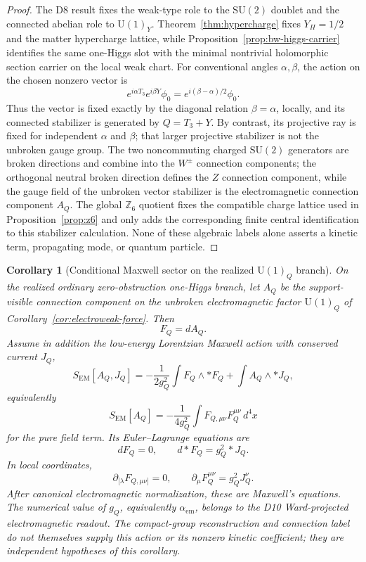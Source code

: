 \documentclass[11pt]{article}
\newtheorem{corollary}[theorem]{Corollary}
\newcommand{\SU}{\mathrm{SU}}
\newcommand{\U}{\mathrm{U}}
\begin{document}
\begin{proof}
The D8 result fixes the weak-type role to the \(\SU(2)\) doublet and the connected abelian role to \(\U(1)_Y\). Theorem~\ref{thm:hypercharge} fixes \(Y_H=1/2\) and the matter hypercharge lattice, while Proposition~\ref{prop:bw-higgs-carrier} identifies the same one-Higgs slot with the minimal nontrivial holomorphic section carrier on the local weak chart. For conventional angles \(\alpha,\beta\), the action on the chosen nonzero vector is
\[
e^{i\alpha T_3}e^{i\beta Y}\phi_0
=e^{i(\beta-\alpha)/2}\phi_0.
\]
Thus the vector is fixed exactly by the diagonal relation \(\beta=\alpha\), locally, and its connected stabilizer is generated by \(Q=T_3+Y\). By contrast, its projective ray is fixed for independent \(\alpha\) and \(\beta\); that larger projective stabilizer is not the unbroken gauge group. The two noncommuting charged \(\SU(2)\) generators are broken directions and combine into the \(W^\pm\) connection components; the orthogonal neutral broken direction defines the \(Z\) connection component, while the gauge field of the unbroken vector stabilizer is the electromagnetic connection component \(A_Q\). The global \(\mathbb Z_6\) quotient fixes the compatible charge lattice used in Proposition~\ref{prop:z6} and only adds the corresponding finite central identification to this stabilizer calculation. None of these algebraic labels alone asserts a kinetic term, propagating mode, or quantum particle.
\end{proof}

\begin{corollary}[Conditional Maxwell sector on the realized \texorpdfstring{\(\U(1)_Q\)}{U(1)Q} branch]\label{cor:maxwell-sector}
On the realized ordinary zero-obstruction one-Higgs branch, let \(A_Q\) be the support-visible connection component on the unbroken electromagnetic factor \(\U(1)_Q\) of Corollary~\ref{cor:electroweak-force}. Then
\[
F_Q=dA_Q.
\]
Assume in addition the low-energy Lorentzian Maxwell action with conserved current \(J_Q\),
\[
S_{\mathrm{EM}}[A_Q,J_Q]
=
-\frac{1}{2g_Q^2}\int F_Q\wedge *F_Q
+\int A_Q\wedge *J_Q,
\]
equivalently
\[
S_{\mathrm{EM}}[A_Q]
=
-\frac{1}{4g_Q^2}
\int F_{Q,\mu\nu}F_Q^{\mu\nu}\,d^4x
\]
for the pure field term. Its Euler--Lagrange equations are
\[
dF_Q=0,
\qquad
d*F_Q=g_Q^2 *J_Q.
\]
In local coordinates,
\[
\partial_{[\lambda}F_{Q,\mu\nu]}=0,
\qquad
\partial_\mu F_Q^{\mu\nu}=g_Q^2 J_Q^\nu.
\]
After canonical electromagnetic normalization, these are Maxwell's equations. The numerical value of \(g_Q\), equivalently \(\alpha_{\mathrm{em}}\), belongs to the D10 Ward-projected electromagnetic readout. The compact-group reconstruction and connection label do not themselves supply this action or its nonzero kinetic coefficient; they are independent hypotheses of this corollary.
\end{corollary}
\end{document}
